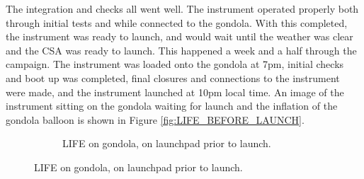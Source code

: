 The integration and checks all went well. The instrument operated properly both through initial tests and while connected to the gondola. With this completed, the instrument was ready to launch, and would wait until the weather was clear and the CSA was ready to launch. This happened a week and a half through the campaign. The instrument was loaded onto the gondola at 7pm, initial checks and boot up was completed, final closures and connections to the instrument were made, and the instrument launched at 10pm local time. An image of the instrument sitting on the gondola waiting for launch and the inflation of the gondola balloon is shown in Figure \ref{fig:LIFE_BEFORE_LAUNCH}.

\begin{figure}
    \begin{subfigure}[h]{0.49\textwidth}
        \centering
        \caption{LIFE on gondola, on launchpad prior to launch.}

\end{subfigure}
\end{figure}
